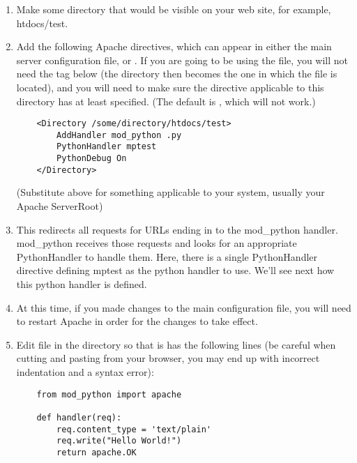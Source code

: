 \begin{enumerate}

\item
  Make some directory that would be visible on your web site, for
  example, htdocs/test.

\item
  Add the following Apache directives, which can appear in either the
  main server configuration file, or .  If you are
  going to be using the  file, you will not need the
   tag below (the directory then becomes the one in
  which the  file is located), and you will need to
  make sure the  directive applicable to this
  directory has at least  specified. (The default is
  , which will not work.)  

  \begin{verbatim}
    <Directory /some/directory/htdocs/test> 
        AddHandler mod_python .py
        PythonHandler mptest 
        PythonDebug On 
    </Directory>
  \end{verbatim}

  (Substitute  above for something applicable to
  your system, usually your Apache ServerRoot)

\item
  This redirects all requests for URLs ending in  to the mod_python
  handler. mod_python receives those requests and looks for an appropriate
  PythonHandler to handle them. Here, there is a single PythonHandler
  directive defining mptest as the python handler to use. We'll see next
  how this python handler is defined.

\item
  At this time, if you made changes to the main configuration file, you
  will need to restart Apache in order for the changes to take effect.

\item
  Edit  file in the  directory so
  that is has the following lines (be careful when cutting and pasting
  from your browser, you may end up with incorrect indentation and a
  syntax error):

  \begin{verbatim}
    from mod_python import apache

    def handler(req):
        req.content_type = 'text/plain'
        req.write("Hello World!")
        return apache.OK 
  \end{verbatim}


\end{enumerate}
